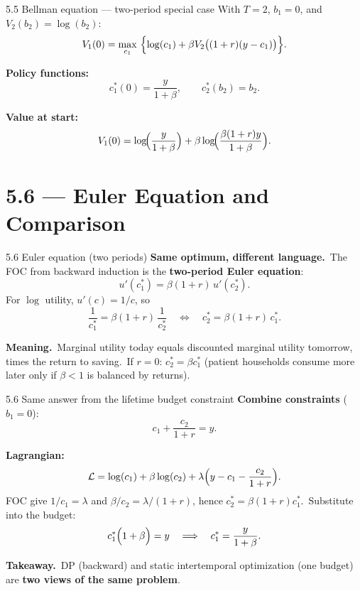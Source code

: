 \documentclass[11pt,aspectratio=169]{beamer}
\begin{document}
\begin{frame}{5.5 Bellman equation --- two-period special case}
  \small
  With $T=2$, $b_1=0$, and $V_2(b_2)=\log(b_2)$:
  \[
    V_1(0)=\max_{c_1}\ \Bigl\{\log(c_1)+\beta V_2\bigl((1+r)(y-c_1)\bigr)\Bigr\}.
  \]

  \medskip
  \textbf{Policy functions:}
  \[
    c_1^*(0)=\frac{y}{1+\beta},
    \qquad
    c_2^*(b_2)=b_2.
  \]

  \medskip
  \textbf{Value at start:}
  \[
    V_1(0)=\log\!\Bigl(\frac{y}{1+\beta}\Bigr)+\beta\log\!\Bigl(\frac{\beta(1+r)y}{1+\beta}\Bigr).
  \]
\end{frame}

\section{5.6 --- Euler Equation and Comparison}

\begin{frame}{5.6 Euler equation (two periods)}
  \small
  \textbf{Same optimum, different language.}\
  The FOC from backward induction is the \textbf{two-period Euler equation}:
  \[
    u'(c_1^*)=\beta(1+r)\,u'(c_2^*).
  \]
  For $\log$ utility, $u'(c)=1/c$, so
  \[
    \frac{1}{c_1^*}=\beta(1+r)\,\frac{1}{c_2^*}
    \quad\Longleftrightarrow\quad
    c_2^*=\beta(1+r)\,c_1^*.
  \]

  \medskip
  \textbf{Meaning.}\
  Marginal utility today equals discounted marginal utility tomorrow, times the return to saving.\
  If $r=0$: $c_2^*=\beta c_1^*$ (patient households consume more later only if $\beta<1$ is balanced by returns).
\end{frame}

\begin{frame}{5.6 Same answer from the lifetime budget constraint}
  \small
  \textbf{Combine constraints} ($b_1=0$):
  \[
    c_1+\frac{c_2}{1+r}=y.
  \]

  \medskip
  \textbf{Lagrangian:}
  \[
    \mathcal{L}=\log(c_1)+\beta\log(c_2)+\lambda\Bigl(y-c_1-\frac{c_2}{1+r}\Bigr).
  \]
  FOC give $1/c_1=\lambda$ and $\beta/c_2=\lambda/(1+r)$, hence $c_2^*=\beta(1+r)c_1^*$.\
  Substitute into the budget:
  \[
    c_1^*\Bigl(1+\beta\Bigr)=y
    \quad\Longrightarrow\quad
    c_1^*=\frac{y}{1+\beta}.
  \]

  \medskip
  \textbf{Takeaway.}\
  DP (backward) and static intertemporal optimization (one budget) are \textbf{two views of the same problem}.
\end{frame}
\end{document}
